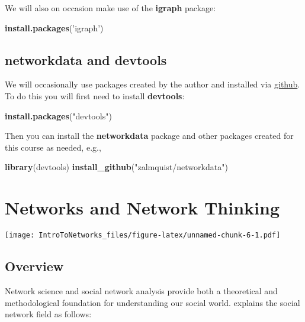 \documentclass[]{book}
\newenvironment{Shaded}{\begin{snugshade}}{\end{snugshade}}
\newcommand{\KeywordTok}[1]{\textcolor[rgb]{0.13,0.29,0.53}{\textbf{{#1}}}}
\newcommand{\StringTok}[1]{\textcolor[rgb]{0.31,0.60,0.02}{{#1}}}
\newcommand{\NormalTok}[1]{{#1}}
\theoremstyle{definition}
\theoremstyle{definition}
\theoremstyle{definition}
\theoremstyle{remark}
\begin{document}
We will also on occasion make use of the \textbf{igraph} package:

\begin{Shaded}
\begin{Highlighting}[]
\KeywordTok{install.packages}\NormalTok{(}\StringTok{'igraph'}\NormalTok{)}
\end{Highlighting}
\end{Shaded}

\section{networkdata and devtools}\label{networkdata-and-devtools}

We will occasionally use packages created by the author and installed
via \href{github.com/}{github}. To do this you will first need to
install \textbf{devtools}:

\begin{Shaded}
\begin{Highlighting}[]
\KeywordTok{install.packages}\NormalTok{(}\StringTok{"devtools"}\NormalTok{)}
\end{Highlighting}
\end{Shaded}

Then you can install the \textbf{networkdata} package and other packages
created for this course as needed, e.g.,

\begin{Shaded}
\begin{Highlighting}[]
\KeywordTok{library}\NormalTok{(devtools)}
\KeywordTok{install_github}\NormalTok{(}\StringTok{"zalmquist/networkdata"}\NormalTok{)}
\end{Highlighting}
\end{Shaded}

\chapter{Networks and Network Thinking}\label{IntroNetworks}

\texttt{[image: IntroToNetworks\_files/figure-latex/unnamed-chunk-6-1.pdf]}

\section{Overview}\label{overview}

Network science and social network analysis provide both a theoretical
and methodological foundation for understanding our social world.
\citet{butts08} explains the social network field as follows:
\end{document}
